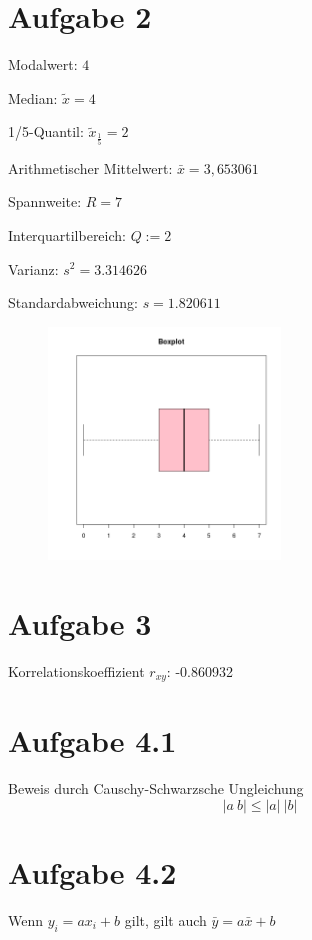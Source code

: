 \FloatBarrier
\section*{Aufgabe 2}
Modalwert: $4$

Median: $\tilde{x} = 4$

1/5-Quantil: $\tilde{x}_{\frac{1}{5}} = 2$

Arithmetischer Mittelwert: $\bar{x} = 3,653061$

Spannweite: $R = 7$

Interquartilbereich: $Q := 2$

Varianz: $s^{2} = 3.314626$

Standardabweichung: $s = 1.820611$

\begin{figure}[h]
\centering
\includegraphics[width=0.55\textwidth]{boxplot.png}
\end{figure}

\FloatBarrier
\section*{Aufgabe 3}
Korrelationskoeffizient $r_{xy}$: -0.860932

\FloatBarrier
\section*{Aufgabe 4.1}
Beweis durch Causchy-Schwarzsche Ungleichung
\begin{equation}
|a \: b| \le |a| \: |b|
\end{equation}

\section*{Aufgabe 4.2}
Wenn \begin{math} y_{i} = ax_{i} + b\end{math} gilt, gilt auch \begin{math} \bar{y} = a\bar{x} + b\end{math}

